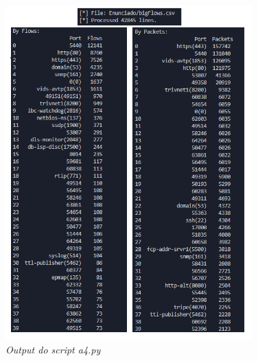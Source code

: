 \begin{figure}[h]
    \label{high}
    \centering
    \includegraphics[width=0.85\textwidth]{Images/a4/a4_a.png}
    \caption{\textit{Output do script a4.py}}
\end{figure}

